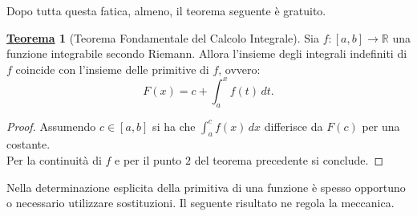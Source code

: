 \documentclass[a4paper,twoside]{article}
\newcommand{\R}{\mathbb{R}}
\theoremstyle{definition}
\newtheorem{theorem}{\color{Red}\underline{\textrm Teorema}}
\numberwithin{theorem}{section}
\begin{document}
Dopo tutta questa fatica, almeno, il teorema seguente è gratuito.
\begin{theorem}[Teorema Fondamentale del Calcolo Integrale]
Sia $f:[a,b]\to\R$ una funzione integrabile secondo Riemann. Allora l'insieme degli integrali indefiniti di $f$ coincide con l'insieme delle primitive di $f$, ovvero: $$F(x)=c+\int_a^x f(t)\,dt.$$    
\end{theorem}
\begin{proof}
    Assumendo $c\in [a,b]$ si ha che $\int_{a}^{c}f(x)\,dx$ differisce da $F(c)$ per una costante.\\  Per la continuità di $f$ e per il punto $2$ del teorema precedente si conclude.
\end{proof}

Nella determinazione esplicita della primitiva di una funzione è spesso opportuno o necessario utilizzare sostituzioni. Il seguente risultato ne regola la meccanica.
\end{document}
